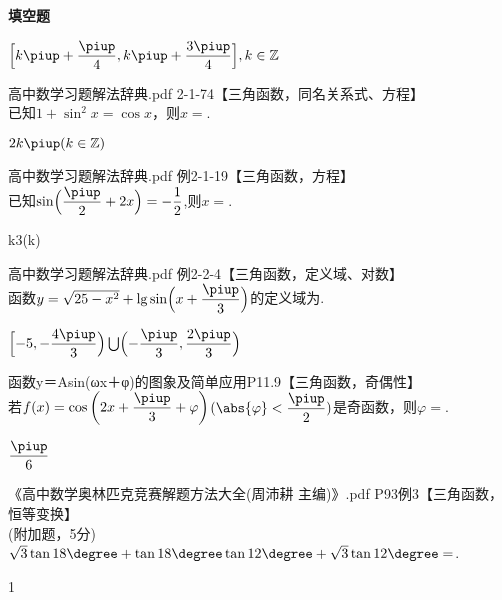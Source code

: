 \begin{exercise}{\bf 填空题}
     \begin{answer}
       $\Bigl[k\piup+\dfrac{\piup}4,k\piup+\dfrac{3\piup}4\Bigr],k\in\mathbb{Z}$
     \end{answer}
   \item 高中数学习题解法辞典.pdf 2-1-74【三角函数，同名关系式、方程】\\
     已知$1+\sin^2x=\cos x$，则$x=$\tk.
     \begin{answer}
       $2k\piup(k\in\mathbb{Z})$
     \end{answer}
    \item 高中数学习题解法辞典.pdf 例2-1-19【三角函数，方程】\\
     已知$\sin\Bigl(\dfrac{\piup}2+2x\Bigr)=-\dfrac12$,则$x=$\tk.
     \begin{answer}
       k\piup\pm\dfrac{\piup}3(k\in{})
     \end{answer}
    \item 高中数学习题解法辞典.pdf 例2-2-4【三角函数，定义域、对数】\\
     函数$y=\sqrt{25-x^2}+\lg\sin\Bigl(x+\dfrac{\piup}3\Bigr)$的定义域为\tk.
     \begin{answer}
       $\Bigl[-5,-\dfrac{4\piup}3\Bigr)\bigcup\Bigl(-\dfrac{\piup}3,\dfrac{2\piup}3\Bigr)$
     \end{answer}
    \item 函数y＝Asin(ωx＋φ)的图象及简单应用P11.9【三角函数，奇偶性】\\
     若$f(x)=\cos\left(2x+\dfrac{\piup}3+\varphi\right)$$(\abs{\varphi}<\dfrac{\piup}2)$是奇函数，则$\varphi=$\tk.
     \begin{answer}
       $\dfrac{\piup}6$
     \end{answer}
    \item 《高中数学奥林匹克竞赛解题方法大全(周沛耕 主编)》.pdf P93例3【三角函数，恒等变换】\\
     (附加题，5分)
     $\sqrt3\tan{18\degree}+\tan{18\degree}\tan{12\degree}+\sqrt3\tan{12\degree}=$\tk.
     \begin{answer}
       1
     \end{answer}
  \end{exercise}
